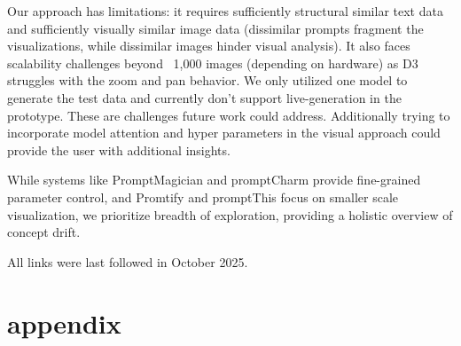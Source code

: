 \documentclass[
  a4paper,  %
  twoside,  %
  bibliography=totoc,
  headsepline,
  cleardoublepage=empty,
  parskip=half,
  draft=false
]{scrbook}
\begin{document}
Our approach has limitations: it requires sufficiently structural similar text data and sufficiently visually similar image data (dissimilar prompts fragment the visualizations, while dissimilar images hinder visual analysis). It also faces scalability challenges beyond ~1,000 images (depending on hardware) as D3 struggles with the zoom and pan behavior. We only utilized one model to generate the test data and currently don't support live-generation in the prototype. These are challenges future work could address. Additionally trying to incorporate model attention and hyper parameters in the visual approach could provide the user with additional insights. 

While systems like PromptMagician and promptCharm \cite{promptCharm,PromptMagician} provide fine-grained parameter control, and Promtify and promptThis \cite{brade2023promptifytexttoimagegenerationinteractive,guo2024prompthisvisualizingprocessinfluence} focus on smaller scale  visualization, we prioritize breadth of exploration, providing a holistic overview of concept drift. 



\printbibliography

All links were last followed in October 2025.

\appendix
%
\chapter{appendix}
\end{document}
